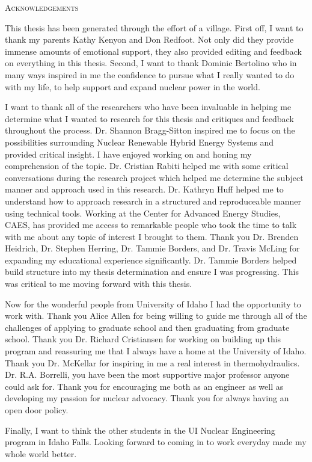 \documentclass[12pt]{UIdahoMastersThesis}
\begin{document}
 \begin{center}
 	{\LARGE\textsc{Acknowledgements}}
    
    This thesis has been generated through the effort of a village.  First off, I want to thank my parents Kathy Kenyon and Don Redfoot.  Not only did they provide immense amounts of emotional support, they also provided editing and feedback on everything in this thesis. Second, I want to thank Dominic Bertolino who in many ways inspired in me the confidence to pursue what I really wanted to do with my life, to help support and expand nuclear power in the world.
    
   
I want to thank all of the researchers who have been invaluable in helping me determine what I wanted to research for this thesis and critiques and feedback throughout the process. Dr. Shannon Bragg-Sitton inspired me to focus on the possibilities surrounding Nuclear Renewable Hybrid Energy Systems and provided critical insight. I have enjoyed working on and honing my comprehension of the topic. Dr. Cristian Rabiti helped me with some critical conversations during the research project which helped me determine the subject manner and approach used in this research. Dr. Kathryn Huff helped me to understand how to approach research in a structured and reproduceable manner using technical tools. Working at the Center for Advanced Energy Studies, CAES, has provided me access to remarkable people who took the time to talk with me about any topic of interest I brought to them. Thank you Dr. Brenden Heidrich, Dr. Stephen Herring, Dr. Tammie Borders, and Dr. Travis McLing for expanding my educational experience significantly. Dr. Tammie Borders helped build structure into my thesis determination and ensure I was  progressing.  This was critical to me moving forward with this thesis. 
    

Now for the wonderful people from University of Idaho I had the opportunity to work with.  Thank you Alice Allen for being willing to guide me through all of the challenges of applying to graduate school and then graduating from graduate school. Thank you Dr. Richard Cristiansen for working on building up this program and reassuring me that I always have a home at the University of Idaho. Thank you Dr. McKellar for inspiring in me a real interest in thermohydraulics.  Dr. R.A. Borrelli, you have been the most supportive major professor anyone could ask for. Thank you for encouraging me both as an engineer as well as developing my passion for nuclear advocacy.  Thank you for always having an open door policy.

Finally, I want to think the other students in the UI Nuclear Engineering program in Idaho Falls. Looking forward to coming in to work everyday made my whole world better. 

 \end{center}
 
\end{document}
